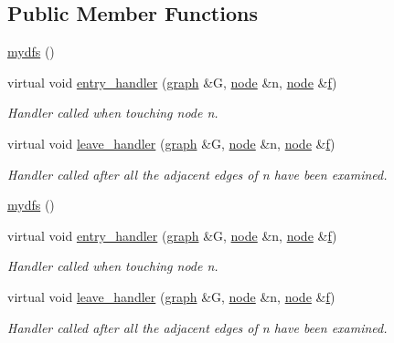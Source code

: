 \subsection*{Public Member Functions}
\begin{DoxyCompactItemize}
\item 
\mbox{\hyperlink{classmydfs_a7c6c14c2212762a9d01b4d4c1def822a}{mydfs}} ()
\item 
virtual void \mbox{\hyperlink{classmydfs_af8bf3716d6d01426821692c1bca8970c}{entry\+\_\+handler}} (\mbox{\hyperlink{classgraph}{graph}} \&G, \mbox{\hyperlink{classnode}{node}} \&n, \mbox{\hyperlink{classnode}{node}} \&\mbox{\hyperlink{rings_8cpp_a77369fc4d5326a16d2c603e032023528}{f}})
\begin{DoxyCompactList}\small\item\em Handler called when touching node {\itshape n}. \end{DoxyCompactList}\item 
virtual void \mbox{\hyperlink{classmydfs_ad5c5cf421b7a3f6d6d6d3b4eba305879}{leave\+\_\+handler}} (\mbox{\hyperlink{classgraph}{graph}} \&G, \mbox{\hyperlink{classnode}{node}} \&n, \mbox{\hyperlink{classnode}{node}} \&\mbox{\hyperlink{rings_8cpp_a77369fc4d5326a16d2c603e032023528}{f}})
\begin{DoxyCompactList}\small\item\em Handler called after all the adjacent edges of {\itshape n} have been examined. \end{DoxyCompactList}\item 
\mbox{\hyperlink{classmydfs_a7c6c14c2212762a9d01b4d4c1def822a}{mydfs}} ()
\item 
virtual void \mbox{\hyperlink{classmydfs_af8bf3716d6d01426821692c1bca8970c}{entry\+\_\+handler}} (\mbox{\hyperlink{classgraph}{graph}} \&G, \mbox{\hyperlink{classnode}{node}} \&n, \mbox{\hyperlink{classnode}{node}} \&\mbox{\hyperlink{rings_8cpp_a77369fc4d5326a16d2c603e032023528}{f}})
\begin{DoxyCompactList}\small\item\em Handler called when touching node {\itshape n}. \end{DoxyCompactList}\item 
virtual void \mbox{\hyperlink{classmydfs_ad5c5cf421b7a3f6d6d6d3b4eba305879}{leave\+\_\+handler}} (\mbox{\hyperlink{classgraph}{graph}} \&G, \mbox{\hyperlink{classnode}{node}} \&n, \mbox{\hyperlink{classnode}{node}} \&\mbox{\hyperlink{rings_8cpp_a77369fc4d5326a16d2c603e032023528}{f}})
\begin{DoxyCompactList}\small\item\em Handler called after all the adjacent edges of {\itshape n} have been examined. \end{DoxyCompactList}\item 

\end{DoxyCompactItemize}
